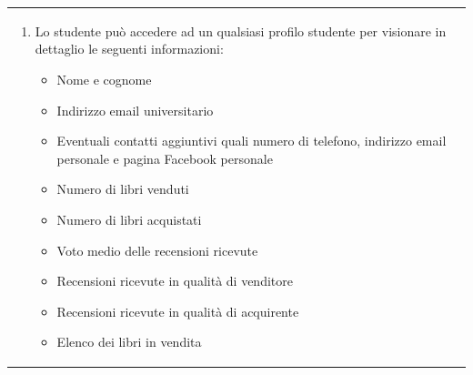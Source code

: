 \documentclass[10pt,a4paper]{report}
\begin{document}
\begin{tabular}{lp{}}
\begin{enumerate}
			\item Lo studente può accedere ad un qualsiasi profilo studente per visionare in dettaglio le seguenti informazioni:
			\begin{itemize}
				\item Nome e cognome
				\item Indirizzo email universitario
				\item Eventuali contatti aggiuntivi quali numero di telefono, indirizzo email personale e pagina Facebook personale
				\item Numero di libri venduti
				\item Numero di libri acquistati
				\item Voto medio delle recensioni ricevute
				\item Recensioni ricevute in qualità di venditore
				\item Recensioni ricevute in qualità di acquirente
				\item Elenco dei libri in vendita
			\end{itemize}
		\end{enumerate}
	\end{tabular}
	
\end{document}
